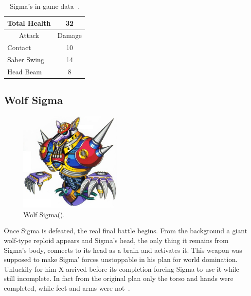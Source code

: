 \begin{table}
	\centering
	\begin{tabular}[h]{l c}
		\toprule
		Total Health  & 32\\
		\midrule
		\multicolumn{1}{c}{Attack} & \multicolumn{1}{c}{Damage}\\
		Contact & 10\\
		Saber Swing & 14\\
		Head Beam& 8\\
		\bottomrule
	\end{tabular}
	\caption{Sigma's in-game data~\cite{wiki:Sigma}.}
\end{table}

\subsection{Wolf Sigma}\label{boss:wolf_sigma}
\begin{figure}[htp]
	\centering
	\includegraphics[height=5cm]{figures/X1/Sigma_stages/WolfSigma.jpg}
	\caption{Wolf Sigma(\cite{book:MMX_Complete_art}).}
\end{figure}
Once Sigma is defeated, the real final battle begins. From the background a giant wolf-type reploid appears and Sigma's head, the only thing it remains from Sigma's body, connects to its head as a brain and activates it. This weapon was supposed to make Sigma' forces unstoppable in his plan for world domination. Unluckily for him X arrived before its completion forcing Sigma to use it while still incomplete. In fact from the original plan only the torso and hands were completed, while feet and arms were not~\cite{wayback:X_resources}.

